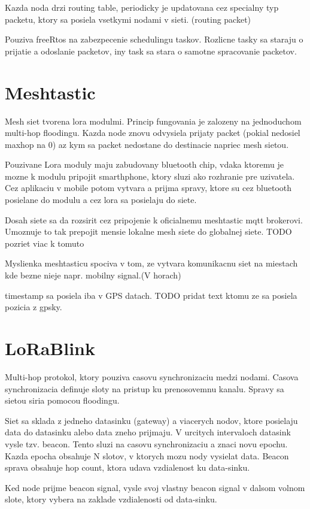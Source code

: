\documentclass[slovak,master]{diploma}
\begin{document}
Kazda noda drzi routing table, periodicky je updatovana cez specialny typ packetu, ktory sa posiela vsetkymi nodami v sieti. (routing packet)

Pouziva freeRtos na zabezpecenie schedulingu taskov. Rozlicne tasky sa staraju o prijatie a odoslanie packetov, iny task sa stara o samotne spracovanie packetov.

\section{Meshtastic}
Mesh siet tvorena lora modulmi. Princip fungovania je zalozeny na jednoduchom multi-hop floodingu.
Kazda node znovu odvysiela prijaty packet (pokial nedosiel maxhop na 0) az kym sa packet nedostane do destinacie napriec mesh sietou.

Pouzivane Lora moduly maju zabudovany bluetooth chip, vdaka ktoremu je mozne k modulu pripojit smarthphone, ktory sluzi ako rozhranie pre
 uzivatela. Cez aplikaciu v mobile potom vytvara a prijma spravy, ktore su cez bluetooth posielane do modulu a cez lora sa posielaju do siete.

Dosah siete sa da rozsirit cez pripojenie k oficialnemu meshtastic mqtt brokerovi. Umoznuje to tak prepojit mensie lokalne mesh siete do globalnej siete. TODO pozriet viac k tomuto

Myslienka meshtasticu spociva v tom, ze vytvara komunikacnu siet na miestach kde bezne nieje napr. mobilny signal.(V horach)

timestamp sa posiela iba v GPS datach. TODO pridat text ktomu ze sa posiela pozicia z gpsky.

\section{LoRaBlink}
Multi-hop protokol, ktory pouziva casovu synchronizaciu medzi nodami. Casova synchronizacia definuje sloty na pristup ku prenosovemnu kanalu.
Spravy sa sietou siria pomocou floodingu.

Siet sa sklada z jedneho datasinku (gateway) a viacerych nodov, ktore posielaju data do datasinku alebo data zneho prijmaju.
V urcitych intervaloch datasink vysle tzv. beacon. Tento sluzi na casovu synchronizaciu a znaci novu epochu. Kazda epocha obsahuje N 
slotov, v ktorych mozu nody vysielat data. Beacon sprava obsahuje hop count, ktora udava vzdialenost ku data-sinku.

Ked node prijme beacon signal, vysle svoj vlastny beacon signal v dalsom volnom slote, ktory vybera na zaklade vzdialenosti od data-sinku.
\end{document}
